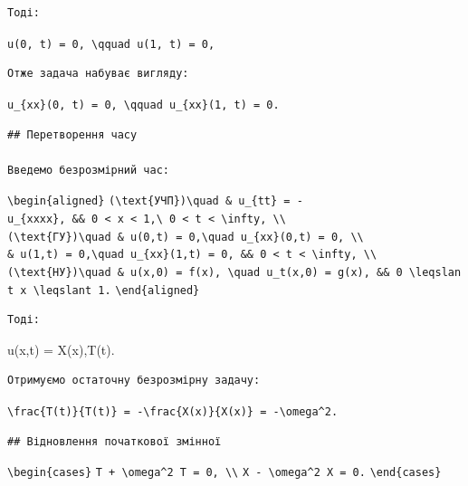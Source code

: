 \documentclass[
  ukrainian,
]{article}
\begin{document}
\begin{verbatim}
Тоді:
\end{verbatim}

\texttt{u(0,\ t)\ =\ 0,\ \textbackslash{}qquad\ u(1,\ t)\ =\ 0,}

\begin{verbatim}
Отже задача набуває вигляду:
\end{verbatim}

\texttt{u\_\{xx\}(0,\ t)\ =\ 0,\ \textbackslash{}qquad\ u\_\{xx\}(1,\ t)\ =\ 0.}

\begin{verbatim}
## Перетворення часу

Введемо безрозмірний час:
\end{verbatim}

\texttt{\textbackslash{}begin\{aligned\}}
\texttt{(\textbackslash{}text\{УЧП\})\textbackslash{}quad\ \&\ u\_\{tt\}\ =\ -u\_\{xxxx\},\ \&\&\ 0\ \textless{}\ x\ \textless{}\ 1,\textbackslash{}\ 0\ \textless{}\ t\ \textless{}\ \textbackslash{}infty,\ \textbackslash{}\textbackslash{}}
\texttt{(\textbackslash{}text\{ГУ\})\textbackslash{}quad\ \&\ u(0,t)\ =\ 0,\textbackslash{}quad\ u\_\{xx\}(0,t)\ =\ 0,\ \textbackslash{}\textbackslash{}}
\texttt{\&\ u(1,t)\ =\ 0,\textbackslash{}quad\ u\_\{xx\}(1,t)\ =\ 0,\ \&\&\ 0\ \textless{}\ t\ \textless{}\ \textbackslash{}infty,\ \textbackslash{}\textbackslash{}}
\texttt{(\textbackslash{}text\{НУ\})\textbackslash{}quad\ \&\ u(x,0)\ =\ f(x),\ \textbackslash{}quad\ u\_t(x,0)\ =\ g(x),\ \&\&\ 0\ \textbackslash{}leqslant\ x\ \textbackslash{}leqslant\ 1.}
\texttt{\textbackslash{}end\{aligned\}}

\begin{verbatim}
Тоді:
\end{verbatim}

u(x,t) = X(x),T(t).

\begin{verbatim}
Отримуємо остаточну безрозмірну задачу:
\end{verbatim}

\texttt{\textbackslash{}frac\{T\textquotesingle{}\textquotesingle{}(t)\}\{T(t)\}\ =\ -\textbackslash{}frac\{X\textquotesingle{}\textquotesingle{}\textquotesingle{}\textquotesingle{}(x)\}\{X(x)\}\ =\ -\textbackslash{}omega\^{}2.}

\begin{verbatim}
## Відновлення початкової змінної
\end{verbatim}

\texttt{\textbackslash{}begin\{cases\}}
\texttt{T\textquotesingle{}\textquotesingle{}\ +\ \textbackslash{}omega\^{}2\ T\ =\ 0,\ \textbackslash{}\textbackslash{}}
\texttt{X\textquotesingle{}\textquotesingle{}\textquotesingle{}\textquotesingle{}\ -\ \textbackslash{}omega\^{}2\ X\ =\ 0.}
\texttt{\textbackslash{}end\{cases\}}
\end{document}
